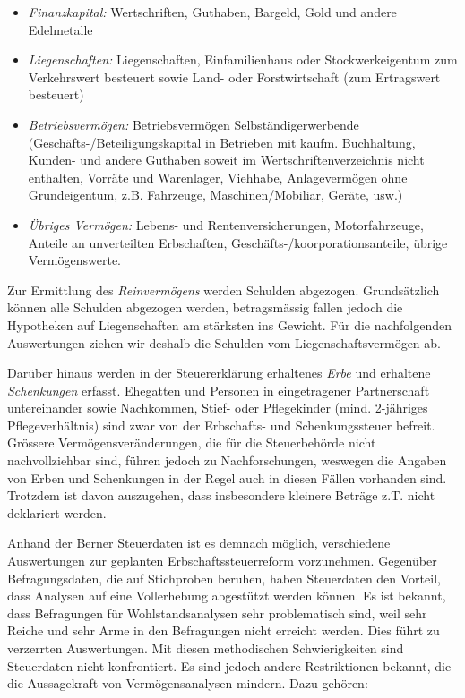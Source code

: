 \documentclass[a4paper, 12pt,liststotoc]{scrartcl}
\numberwithin{equation}{section}
\begin{document}
\begin{itemize}
\item
  \emph{Finanzkapital:} Wertschriften, Guthaben, Bargeld, Gold und
  andere Edelmetalle
\item
  \emph{Liegenschaften:} Liegenschaften, Einfamilienhaus oder
  Stockwerkeigentum zum Verkehrswert besteuert sowie Land- oder
  Forstwirtschaft (zum Ertragswert besteuert)
\item
  \emph{Betriebsvermögen:} Betriebsvermögen Selbständigerwerbende
  (Geschäfts-/Be\-tei\-li\-gungs\-ka\-pi\-tal in Betrieben mit kaufm. Buchhaltung,
  Kunden- und andere Guthaben soweit im Wertschriftenverzeichnis nicht
  enthalten, Vorräte und Warenlager, Viehhabe, Anlagevermögen ohne
  Grundeigentum, z.B. Fahrzeuge, Maschinen/Mobiliar, Geräte, usw.)
\item
  \emph{Übriges Vermögen:} Lebens- und Rentenversicherungen,
  Motorfahrzeuge, Anteile an unverteilten Erbschaften,
  Geschäfts-/koorporationsanteile, übrige Vermögenswerte.
\end{itemize}

Zur Ermittlung des \emph{Reinvermögens} werden Schulden abgezogen.
Grundsätzlich können alle Schulden abgezogen werden, betragsmässig
fallen jedoch die Hypotheken auf Liegenschaften am stärksten ins
Gewicht. Für die nachfolgenden Auswertungen ziehen wir deshalb die Schulden vom Liegenschaftsvermögen ab.

Darüber hinaus werden in der Steuererklärung erhaltenes \emph{Erbe} und
erhaltene \emph{Schenkungen} erfasst. Ehegatten und Personen in eingetragener
Partnerschaft untereinander sowie Nachkommen, Stief- oder Pflegekinder
(mind. 2-jähriges Pflegeverhältnis) sind zwar von der Erbschafts- und
Schenkungssteuer befreit. Grössere Vermögensveränderungen, die für die
Steuerbehörde nicht nachvollziehbar sind, führen jedoch zu
Nachforschungen, weswegen die Angaben von Erben und Schenkungen in der
Regel auch in diesen Fällen vorhanden sind. Trotzdem ist davon
auszugehen, dass insbesondere kleinere Beträge z.T. nicht deklariert werden.

Anhand der Berner Steuerdaten ist es demnach möglich, verschiedene
Auswertungen zur geplanten Erbschaftssteuerreform vorzunehmen. Gegenüber
Befragungsdaten, die auf Stichproben beruhen, haben Steuerdaten den
Vorteil, dass Analysen auf eine Vollerhebung abgestützt werden können.
Es ist bekannt, dass Befragungen für Wohlstandsanalysen sehr
problematisch sind, weil sehr Reiche und sehr Arme in den Befragungen
nicht erreicht werden. Dies führt zu verzerrten Auswertungen. Mit diesen
methodischen Schwierigkeiten sind Steuerdaten nicht konfrontiert. Es
sind jedoch andere Restriktionen bekannt, die die Aussagekraft von
Vermögensanalysen mindern. Dazu gehören:
\end{document}
